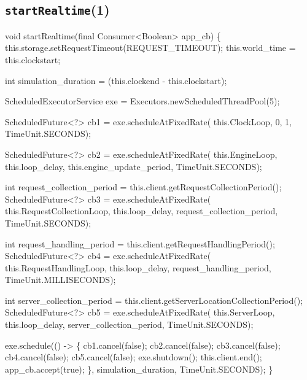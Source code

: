\subsection{\texttt{startRealtime}(1)}
\nwenddocs{}\endmoddef{}
void startRealtime(final Consumer<Boolean> app_cb) \{
  this.storage.setRequestTimeout(REQUEST_TIMEOUT);
  this.world_time = this.clockstart;

  int simulation_duration = (this.clockend - this.clockstart);

  ScheduledExecutorService exe = Executors.newScheduledThreadPool(5);

  ScheduledFuture<?> cb1 = exe.scheduleAtFixedRate(
    this.ClockLoop, 0, 1, TimeUnit.SECONDS);

  ScheduledFuture<?> cb2 = exe.scheduleAtFixedRate(
    this.EngineLoop, this.loop_delay, this.engine_update_period, TimeUnit.SECONDS);

  int request_collection_period = this.client.getRequestCollectionPeriod();
  ScheduledFuture<?> cb3 = exe.scheduleAtFixedRate(
    this.RequestCollectionLoop, this.loop_delay, request_collection_period, TimeUnit.SECONDS);

  int request_handling_period = this.client.getRequestHandlingPeriod();
  ScheduledFuture<?> cb4 = exe.scheduleAtFixedRate(
    this.RequestHandlingLoop, this.loop_delay, request_handling_period, TimeUnit.MILLISECONDS);

  int server_collection_period = this.client.getServerLocationCollectionPeriod();
  ScheduledFuture<?> cb5 = exe.scheduleAtFixedRate(
    this.ServerLoop, this.loop_delay, server_collection_period, TimeUnit.SECONDS);

  exe.schedule(() -> \{
    cb1.cancel(false);
    cb2.cancel(false);
    cb3.cancel(false);
    cb4.cancel(false);
    cb5.cancel(false);
    exe.shutdown();
    this.client.end();
    app_cb.accept(true);
  \}, simulation_duration, TimeUnit.SECONDS);
\}
\eatline
{}\nwendcode{}\nwdocspar
